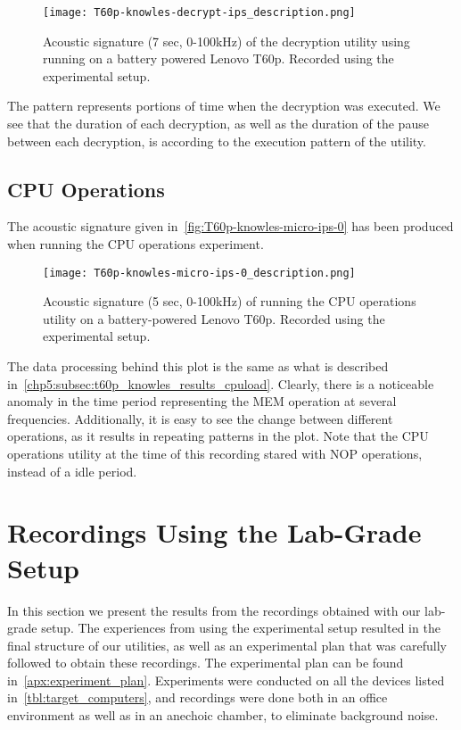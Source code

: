 \begin{figure}[ht]
    \centering
    \texttt{[image: T60p-knowles-decrypt-ips\_description.png]}
    \caption{Acoustic signature (7 sec, 0-100kHz) of the decryption utility using running on a battery powered Lenovo T60p.
        Recorded using the experimental setup.}
    \label{fig:T60p-knowles-decrypt-ips}
\end{figure}

The pattern represents portions of time when the decryption was executed.
We see that the duration of each decryption, as well as the duration of the pause between each decryption, is according to the execution pattern of the utility.


\subsection{CPU Operations}\label{chp5:subsec:t60p_knowles_results_micro}
The acoustic signature given in~\autoref{fig:T60p-knowles-micro-ips-0} has been produced when running the CPU operations experiment.

\begin{figure}[ht]
    \centering
    \texttt{[image: T60p-knowles-micro-ips-0\_description.png]}
    \caption{Acoustic signature (5 sec, 0-100kHz) of running the CPU operations utility on a battery-powered Lenovo T60p.
        Recorded using the experimental setup.}
    \label{fig:T60p-knowles-micro-ips-0}
\end{figure}

The data processing behind this plot is the same as what is described in~\autoref{chp5:subsec:t60p_knowles_results_cpuload}.
Clearly, there is a noticeable anomaly in the time period representing the MEM operation at several frequencies.
Additionally, it is easy to see the change between different operations, as it results in repeating patterns in the plot.
Note that the CPU operations utility at the time of this recording stared with NOP operations, instead of a idle period.



\section{Recordings Using the Lab-Grade Setup}\label{chp5:sec:bk_results}
In this section we present the results from the recordings obtained with our lab-grade setup.
The experiences from using the experimental setup resulted in the final structure of our utilities, as well as an experimental plan that was carefully followed to obtain these recordings.
The experimental plan can be found in~\autoref{apx:experiment_plan}.
Experiments were conducted on all the devices listed in~\autoref{tbl:target_computers}, and recordings were done both in an office environment as well as in an anechoic chamber, to eliminate background noise.

